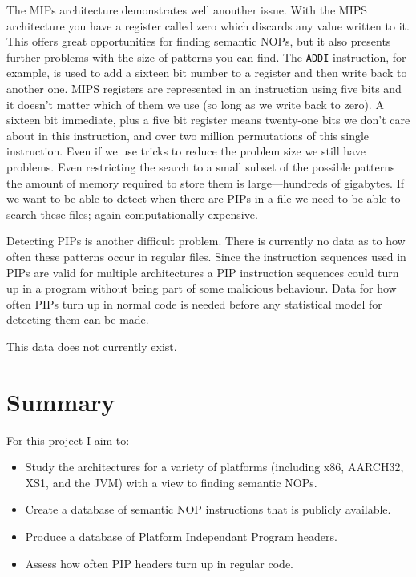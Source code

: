 \documentclass[]{book}
\begin{document}
The MIPs architecture demonstrates well anouther issue. With the MIPS
architecture you have a register called zero which discards any value
written to it. This offers great opportunities for finding semantic
NOPs, but it also presents further problems with the size of patterns
you can find. The \lstinline!ADDI! instruction, for example, is used to
add a sixteen bit number to a register and then write back to another
one. MIPS registers are represented in an instruction using five bits
and it doesn't matter which of them we use (so long as we write back to
zero). A sixteen bit immediate, plus a five bit register means
twenty-one bits we don't care about in this instruction, and over two
million permutations of this single instruction. Even if we use tricks
to reduce the problem size we still have problems. Even restricting the
search to a small subset of the possible patterns the amount of memory
required to store them is large---hundreds of gigabytes. If we want to
be able to detect when there are PIPs in a file we need to be able to
search these files; again computationally expensive.

Detecting PIPs is another difficult problem. There is currently no data
as to how often these patterns occur in regular files. Since the
instruction sequences used in PIPs are valid for multiple architectures
a PIP instruction sequences could turn up in a program without being
part of some malicious behaviour. Data for how often PIPs turn up in
normal code is needed before any statistical model for detecting them
can be made.

This data does not currently exist.

\section{Summary}

For this project I aim to:

\begin{itemize}
\item
  Study the architectures for a variety of platforms (including x86,
  AARCH32, XS1, and the JVM) with a view to finding semantic NOPs.
\item
  Create a database of semantic NOP instructions that is publicly
  available.
\item
  Produce a database of Platform Independant Program headers.\\
\item
  Assess how often PIP headers turn up in regular code.
\end{itemize}
\end{document}
